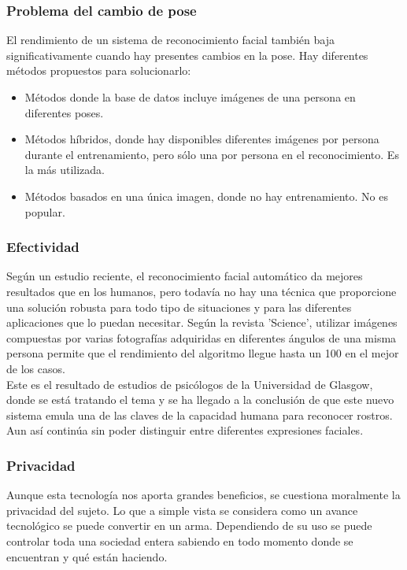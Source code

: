 \documentclass[a4paper,11pt]{article}
\begin{document}
 \subsubsection{Problema del cambio de pose}
 El rendimiento de un sistema de reconocimiento facial también baja significativamente cuando hay presentes cambios en la pose. Hay diferentes métodos propuestos para solucionarlo:
  \begin{itemize}
 \item Métodos donde la base de datos incluye imágenes de una persona en diferentes poses.
 \item Métodos híbridos, donde hay disponibles diferentes imágenes por persona durante el entrenamiento, pero sólo una por persona en el reconocimiento. Es la más utilizada.
\item  Métodos basados en una única imagen, donde no hay entrenamiento. No es popular.
  \end{itemize}
\subsubsection{ Efectividad}
 	Según un estudio reciente, el reconocimiento facial automático da mejores resultados que en los humanos, pero todavía no hay una técnica que proporcione una solución robusta para todo tipo de situaciones y para las diferentes aplicaciones que lo puedan necesitar. Según la revista 'Science', utilizar imágenes compuestas por varias fotografías adquiridas en diferentes ángulos de una misma persona permite que el rendimiento del algoritmo llegue hasta un 100 en el mejor de los casos.\\
 	
 	 Este es el resultado de estudios de psicólogos de la Universidad de Glasgow, donde se está tratando el tema y se ha llegado a la conclusión de que este nuevo sistema emula una de las claves de la capacidad humana para reconocer rostros. Aun así continúa sin poder distinguir entre diferentes expresiones faciales.
 	
 	\subsubsection{ Privacidad}
 	Aunque esta tecnología nos aporta grandes beneficios, se cuestiona moralmente la privacidad del sujeto. Lo que a simple vista se considera como un avance tecnológico se puede convertir en un arma. Dependiendo de su uso se puede controlar toda una sociedad entera sabiendo en todo momento donde se encuentran y qué están haciendo.
 	
\end{document}
